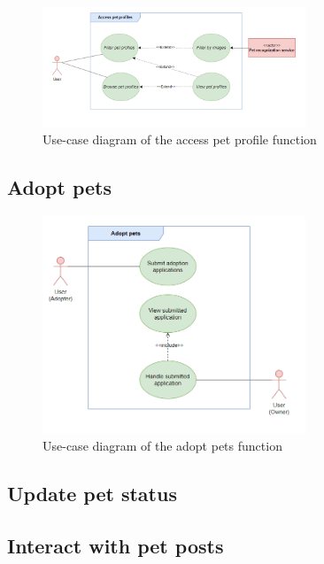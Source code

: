 \begin {figure}[H]
\centering
\includegraphics[width=0.7\textwidth]{Figures/access_pet_ucd.png}
\caption{Use-case diagram of the access pet profile function}
\label{fig:access-pet-activity-diagram}
\end{figure}



\subsection{Adopt pets}

\begin {figure}[H]
\centering
\includegraphics[width=0.7\textwidth]{Figures/adopt_pet_ucd.png}
\caption{Use-case diagram of the adopt pets function}
\label{fig:adopt-pet-activity-diagram}
\end{figure}



\subsection{Update pet status}



\subsection{Interact with pet posts}


